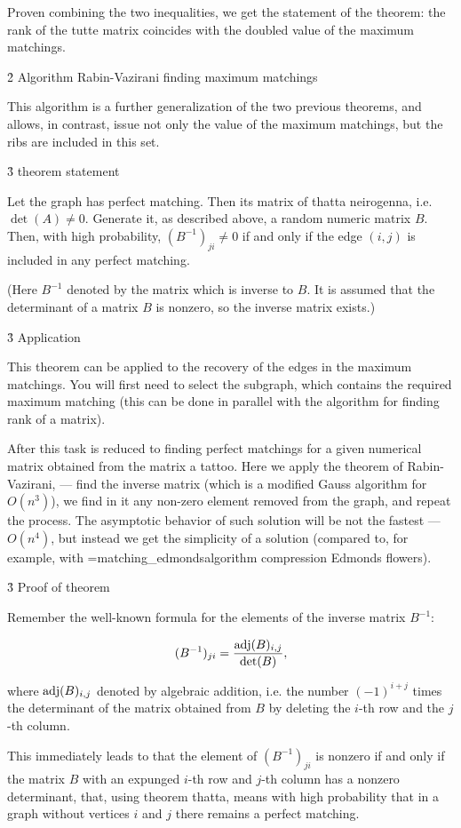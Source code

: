 Proven combining the two inequalities, we get the statement of the theorem: the rank of the tutte matrix coincides with the doubled value of the maximum matchings.


\h2{ Algorithm Rabin-Vazirani finding maximum matchings }

This algorithm is a further generalization of the two previous theorems, and allows, in contrast, issue not only the value of the maximum matchings, but the ribs are included in this set.


\h3{ theorem statement }

Let the graph has perfect matching. Then its matrix of thatta neirogenna, i.e. $\det(A) \ne 0$. Generate it, as described above, a random numeric matrix $B$. Then, with high probability, $(B^{-1})_{ji} \ne 0$ if and only if the edge $(i,j)$ is included in any perfect matching.

(Here $B^{-1}$ denoted by the matrix which is inverse to $B$. It is assumed that the determinant of a matrix $B$ is nonzero, so the inverse matrix exists.)


\h3{ Application }

This theorem can be applied to the recovery of the edges in the maximum matchings. You will first need to select the subgraph, which contains the required maximum matching (this can be done in parallel with the algorithm for finding rank of a matrix).

After this task is reduced to finding perfect matchings for a given numerical matrix obtained from the matrix a tattoo. Here we apply the theorem of Rabin-Vazirani, --- find the inverse matrix (which is a modified Gauss algorithm for $O (n^3)$), we find in it any non-zero element removed from the graph, and repeat the process. The asymptotic behavior of such solution will be not the fastest --- $O (n^4)$, but instead we get the simplicity of a solution (compared to, for example, with \algohref=matching_edmonds{algorithm compression Edmonds flowers}).


\h3{ Proof of theorem }

Remember the well-known formula for the elements of the inverse matrix $B^{-1}$:

$$ (B^{-1})_{ji} = \frac{ {\rm adj}(B)_{i,j} }{ \det(B) }, $$

where ${\rm adj}(B)_{i,j}$ denoted by algebraic addition, i.e. the number $(-1)^{i+j}$ times the determinant of the matrix obtained from $B$ by deleting the $i$-th row and the $j$-th column.

This immediately leads to that the element of $(B^{-1})_{ji}$ is nonzero if and only if the matrix $B$ with an expunged $i$-th row and $j$-th column has a nonzero determinant, that, using theorem thatta, means with high probability that in a graph without vertices $i$ and $j$ there remains a perfect matching.



